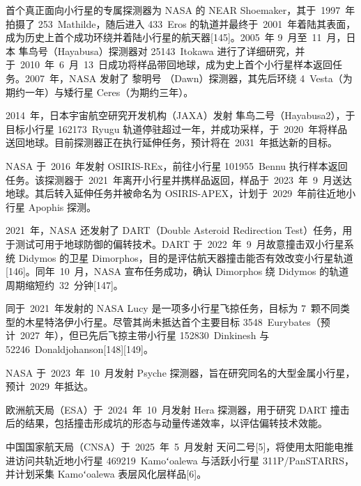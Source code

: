 首个真正面向小行星的专属探测器为 NASA 的 NEAR Shoemaker，其于~1997~年拍摄了 253~Mathilde，随后进入 433~Eros 的轨道并最终于~2001~年着陆其表面，成为历史上首个成功环绕并着陆小行星的航天器[145]。2005~年 9~月至~11~月，日本 隼鸟号（Hayabusa）探测器对 25143~Itokawa 进行了详细研究，并于~2010~年~6~月~13~日成功将样品带回地球，成为史上首个小行星样本返回任务。2007~年，NASA 发射了 黎明号
（Dawn）探测器，其先后环绕 4~Vesta（为期约一年）与矮行星 Ceres（为期约三年）。

2014~年，日本宇宙航空研究开发机构（JAXA）发射 隼鸟二号（Hayabusa2），于目标小行星 162173~Ryugu 轨道停驻超过一年，并成功采样，于~2020~年将样品送回地球。目前探测器正在执行延伸任务，预计将在~2031~年抵达新的目标。

NASA 于~2016~年发射 OSIRIS{\text -}REx，前往小行星 101955~Bennu 执行样本返回任务。该探测器于~2021~年离开小行星并携样品返回，样品于~2023~年~9~月送达地球。其后转入延伸任务并被命名为 OSIRIS{\text -}APEX，计划于~2029~年前往近地小行星 Apophis 探测。

2021~年，NASA 还发射了 DART（Double Asteroid Redirection Test）任务，用于测试可用于地球防御的偏转技术。DART 于~2022~年~9~月故意撞击双小行星系统 Didymos 的卫星 Dimorphos，目的是评估航天器撞击能否有效改变小行星轨道[146]。同年~10~月，NASA 宣布任务成功，确认 Dimorphos 绕 Didymos 的轨道周期缩短约~32~分钟[147]。

同于~2021~年发射的 NASA Lucy 是一项多小行星飞掠任务，目标为 7~颗不同类型的木星特洛伊小行星。尽管其尚未抵达首个主要目标 3548~Eurybates（预计~2027~年），但已先后飞掠主带小行星 152830~Dinkinesh 与 52246~Donaldjohanson[148][149]。

NASA 于~2023~年~10~月发射 Psyche 探测器，旨在研究同名的大型金属小行星，预计~2029~年抵达。

欧洲航天局（ESA）于~2024~年~10~月发射 Hera 探测器，用于研究 DART 撞击后的结果，包括撞击形成坑的形态与动量传递效率，以评估偏转技术效能。

中国国家航天局（CNSA）于~2025~年~5~月发射 天问二号[5]，将使用太阳能电推进访问共轨近地小行星 469219~Kamoʻoalewa 与活跃小行星 311P/PanSTARRS，并计划采集 Kamoʻoalewa 表层风化层样品[6]。



